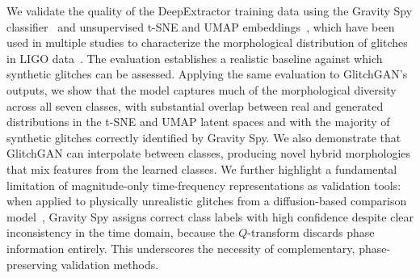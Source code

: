 \documentclass[reprint,nofootinbib,amsmath,amssymb,aps,floatfix]{revtex4-2}
\begin{document}
We validate the quality of the DeepExtractor training data using the Gravity Spy classifier~\cite{Zevin_2017, Glanzer_2023, GspyO4} and unsupervised t-SNE \cite{TSNE} and UMAP embeddings~\cite{McInnes_2018}, which have been used in multiple studies to characterize the morphological distribution of glitches in LIGO data~\cite{ferreira2025analysisligoglitchesusing, Ferreira_2025, deshmukh2026soundnoiseleveraginginductive}.
The evaluation establishes a realistic baseline against which synthetic glitches can be assessed.
Applying the same evaluation to GlitchGAN's outputs, we show that the model captures much of the morphological diversity across all seven classes, with substantial overlap between real and generated distributions in the t-SNE and UMAP latent spaces and with the majority of synthetic glitches correctly identified by Gravity Spy.
We also demonstrate that GlitchGAN can interpolate between classes, producing novel hybrid morphologies that mix features from the learned classes.
We further highlight a fundamental limitation of magnitude-only time-frequency representations as validation tools: when applied to physically unrealistic glitches from a diffusion-based comparison model~\cite{diffusionOriginal}, Gravity Spy assigns correct class labels with high confidence despite clear inconsistency in the time domain, because the $Q$-transform discards phase information entirely.
This underscores the necessity of complementary, phase-preserving validation methods.

\end{document}
